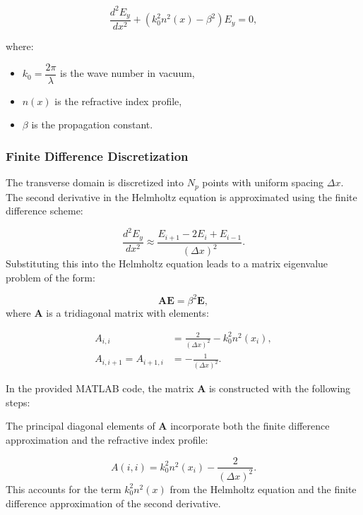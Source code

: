 \documentclass{article}
\begin{document}
\begin{equation}
\frac{d^2 E_y}{dx^2} + \left( k_0^2 n^2(x) - \beta^2 \right) E_y = 0,
\end{equation}

where:
\begin{itemize}
    \item $k_0 = \dfrac{2\pi}{\lambda}$ is the wave number in vacuum,
    \item $n(x)$ is the refractive index profile,
    \item $\beta$ is the propagation constant.
\end{itemize}

\subsubsection{Finite Difference Discretization}

The transverse domain is discretized into $N_p$ points with uniform spacing $\Delta x$. The second derivative in the Helmholtz equation is approximated using the finite difference scheme:

\begin{equation}
\frac{d^2 E_y}{dx^2} \approx \frac{E_{i+1} - 2E_i + E_{i-1}}{(\Delta x)^2}.
\end{equation}
Substituting this into the Helmholtz equation leads to a matrix eigenvalue problem of the form:

\begin{equation}
\mathbf{A} \mathbf{E} = \beta^2 \mathbf{E},
\end{equation}
where $\mathbf{A}$ is a tridiagonal matrix with elements:

\begin{align}
A_{i,i} &= \frac{2}{(\Delta x)^2} - k_0^2 n^2(x_i), \\
A_{i,i+1} = A_{i+1,i} &= -\frac{1}{(\Delta x)^2}.
\end{align}

In the provided MATLAB code, the matrix $\mathbf{A}$ is constructed with the following steps:

The principal diagonal elements of $\mathbf{A}$ incorporate both the finite difference approximation and the refractive index profile:

\begin{equation}
A(i,i) = k_0^2 n^2(x_i) - \frac{2}{(\Delta x)^2}.
\end{equation}
This accounts for the term $k_0^2 n^2(x)$ from the Helmholtz equation and the finite difference approximation of the second derivative.
\end{document}

